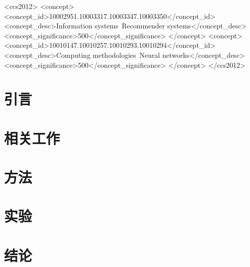 \documentclass[sigconf]{acmart}
\begin{document}
\begin{CCSXML}
<ccs2012>
<concept>
<concept_id>10002951.10003317.10003347.10003350</concept_id>
<concept_desc>Information systems~Recommender systems</concept_desc>
<concept_significance>500</concept_significance>
</concept>
<concept>
<concept_id>10010147.10010257.10010293.10010294</concept_id>
<concept_desc>Computing methodologies~Neural networks</concept_desc>
<concept_significance>500</concept_significance>
</concept>
</ccs2012>
\end{CCSXML}



\maketitle

\section{引言}\label{sec:intro}


\section{相关工作} \label{sec:related}


\section{方法}\label{sec:model}


\section{实验}\label{sec:exp}


\section{结论} \label{sec:conclusion}

\end{document}
